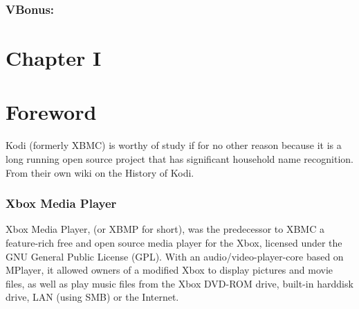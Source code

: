 \documentclass[12pt]{report}
\begin{document}
\subsubsection*{V\hspace*{10pt}\hspace*{10pt}Bonus: }

\vspace{\baselineskip}

\vspace{\baselineskip}

\vspace{\baselineskip}

\vspace{\baselineskip}

\vspace{\baselineskip}

\vspace{\baselineskip}



\newpage

\vspace{\baselineskip}
\vspace{\baselineskip}
\section*{Chapter I}
\section*{Foreword}

\vspace{\baselineskip}
Kodi (formerly XBMC) is worthy of study if for no other reason because it is a long running open source project that has significant household name recognition. From their own wiki on the History of Kodi. \par


\vspace{\baselineskip}
\subsubsection*{Xbox Media Player}
Xbox Media Player, (or XBMP for short), was the predecessor to XBMC a feature-rich free and open source media player for the Xbox, licensed under the GNU General Public License (GPL). With an audio/video-player-core based on MPlayer, it allowed owners of a modified Xbox to display pictures and movie files, as well as play music files from the Xbox DVD-ROM drive, built-in harddisk drive, LAN (using SMB) or the Internet.\par
\end{document}
